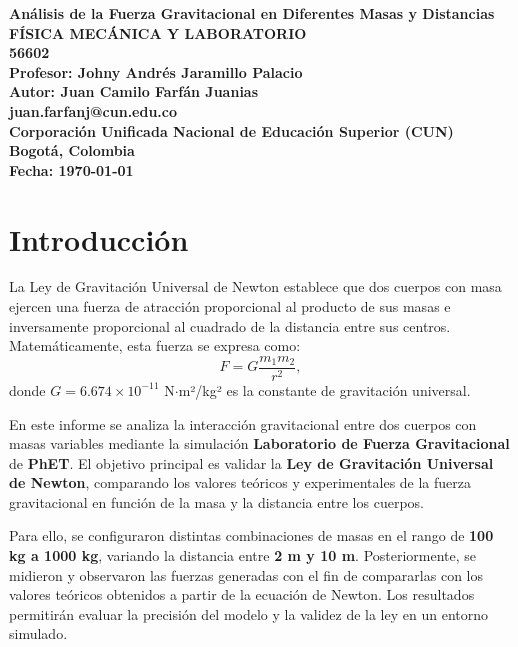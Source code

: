 \documentclass[a4paper,12pt]{article}
\begin{document}
\begin{titlepage}
    \begin{center}
        \textbf{\Huge Análisis de la Fuerza Gravitacional en Diferentes Masas y Distancias}\\[5cm]
        \textbf{\LARGE FÍSICA MECÁNICA Y LABORATORIO}\\[1cm]
        \textbf{\LARGE 56602}\\[2cm]
        \textbf{\Large Profesor: Johny Andrés Jaramillo Palacio}\\[3cm]
        \textbf{\Large Autor: Juan Camilo Farfán Juanias}\\[0.5cm]
        \textbf{\large juan.farfanj@cun.edu.co}\\[3cm]
        \textbf{\Large Corporación Unificada Nacional de Educación Superior (CUN)}\\[0.5cm]
        \textbf{\Large Bogotá, Colombia}\\[0.5cm]
        \textbf{\Large Fecha: \today}
    \end{center}
\end{titlepage}

\newpage
\tableofcontents

\newpage
\section{Introducción}
La Ley de Gravitación Universal de Newton establece que dos cuerpos con masa ejercen una fuerza de atracción proporcional al producto de sus masas e inversamente proporcional al cuadrado de la distancia entre sus centros. Matemáticamente, esta fuerza se expresa como:
\begin{equation}
    F = G \frac{m_1 m_2}{r^2},
\end{equation}
donde \( G = 6.674 \times 10^{-11} \) N\(\cdot\)m²/kg² es la constante de gravitación universal.

En este informe se analiza la interacción gravitacional entre dos cuerpos con masas variables mediante la simulación \textbf{Laboratorio de Fuerza Gravitacional} de \textbf{PhET}. El objetivo principal es validar la \textbf{Ley de Gravitación Universal de Newton}, comparando los valores teóricos y experimentales de la fuerza gravitacional en función de la masa y la distancia entre los cuerpos.

Para ello, se configuraron distintas combinaciones de masas en el rango de \textbf{100 kg a 1000 kg}, variando la distancia entre \textbf{2 m y 10 m}. Posteriormente, se midieron y observaron las fuerzas generadas con el fin de compararlas con los valores teóricos obtenidos a partir de la ecuación de Newton. Los resultados permitirán evaluar la precisión del modelo y la validez de la ley en un entorno simulado.
\end{document}
